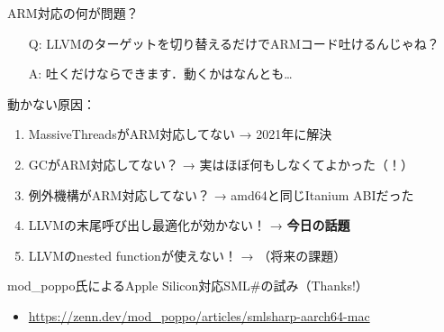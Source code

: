 \documentclass[aspectratio=169,t,dvipdfmx,12pt]{beamer}
\newcommand\smlsharp{SML\#}
\begin{document}
\begin{frame}{ARM対応の何が問題？}

\begin{itemize}
\item[Q:] LLVMのターゲットを切り替えるだけでARMコード吐けるんじゃね？
\item[A:] 吐くだけならできます．動くかはなんとも…
\end{itemize}

\bigskip

動かない原因：
\begin{enumerate}
\item MassiveThreadsがARM対応してない → 2021年に解決
\item GCがARM対応してない？ → 実はほぼ何もしなくてよかった（！）
\item 例外機構がARM対応してない？ → amd64と同じItanium ABIだった
\item LLVMの末尾呼び出し最適化が効かない！ → \textbf{今日の話題}
\item LLVMのnested functionが使えない！ → （将来の課題）
\end{enumerate}

\bigskip

mod\_poppo氏によるApple Silicon対応\smlsharp{}の試み（Thanks!）
\begin{itemize}
\item \url{https://zenn.dev/mod_poppo/articles/smlsharp-aarch64-mac}
\end{itemize}

\end{frame}
\end{document}
